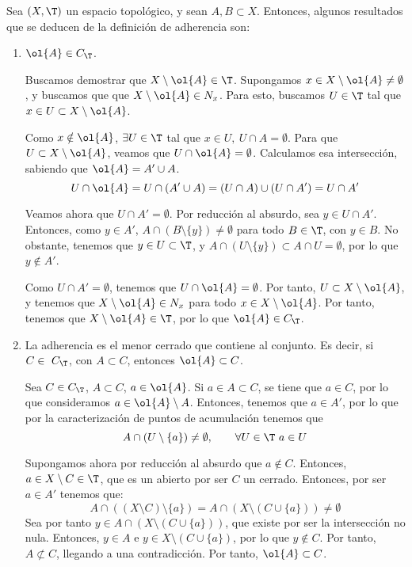 Sea $(X,\T)$ un espacio topológico, y sean $A,B\subset X$. Entonces, algunos resultados que se deducen de la definición de adherencia son:
\begin{enumerate}
    \item $\ol{A}\in C_\T$.

    Buscamos demostrar que $X\setminus \ol{A}\in \T$. Supongamos $x\in X\setminus \ol{A}\neq \emptyset$, y buscamos que que $X\setminus \ol{A}\in N_x$. Para esto, buscamos $U\in \T$ tal que $x\in U\subset X\setminus \ol{A}$.
    
    Como $x\notin \ol{A}$, $\exists U\in \T$ tal que $x\in U,~U\cap A=\emptyset$. Para que $U\subset X\setminus \ol{A}$, veamos que $U\cap \ol{A}=\emptyset$.  Calculamos esa intersección, sabiendo que $\ol{A}=A'\cup A$.
    \begin{equation*}
        U\cap \ol{A} = U\cap (A'\cup A) = (U\cap A)\cup (U\cap A')=U\cap A'
    \end{equation*}

    Veamos ahora que $U\cap A'=\emptyset$. Por reducción al absurdo, sea $y\in U\cap A'$. Entonces, como $y\in A'$, $A\cap (B\setminus \{y\})\neq \emptyset$ para todo $B\in \T$, con $y\in B$. No obstante, tenemos que $y\in U\subset \T$, y $A\cap (U\setminus \{y\})\subset A\cap U=\emptyset$, por lo que $y\notin A'$.

    Como $U\cap A'=\emptyset$, tenemos que $U\cap \ol{A}=\emptyset$. Por tanto, $U\subset X\setminus \ol{A}$, y tenemos que $X\setminus \ol{A}\in N_x$ para todo $x\in X\setminus \ol{A}$. Por tanto, tenemos que $X\setminus \ol{A}\in \T$, por lo que $\ol{A}\in C_\T$.
    
    \item La adherencia es el menor cerrado que contiene al conjunto. Es decir, si $C\in~C_\T$, con $A\subset C$, entonces $\ol{A}\subset C$.

    Sea $C\in C_\T$, $A\subset C$, $a\in \ol{A}$. Si $a\in A\subset C$, se tiene que $a\in C$, por lo que consideramos $a\in \ol{A}\setminus A$. Entonces, tenemos que $a\in A'$, por lo que por la caracterización de puntos de acumulación tenemos que
    \begin{equation*}
        A\cap (U\setminus \{a\})\neq \emptyset,\qquad \forall U\in \T~a\in U
    \end{equation*}

    Supongamos ahora por reducción al absurdo que $a\notin C$. Entonces, $a\in X\setminus C\in \T$, que es un abierto por ser $C$ un cerrado. Entonces, por ser $a\in A'$ tenemos que:
    \begin{equation*}
        A\cap ((X\setminus C)\setminus \{a\}) = A\cap (X\setminus (C\cup \{a\})) \neq \emptyset
    \end{equation*}
    Sea por tanto $y\in A\cap (X\setminus (C\cup \{a\}))$, que existe por ser la intersección no nula. Entonces, $y\in A$ e $y\in X\setminus (C\cup \{a\})$, por lo que $y\notin C$. Por tanto, $A\not\subset C$, llegando a una contradicción. Por tanto, $\ol{A} \subset C$.
    

\end{enumerate}
